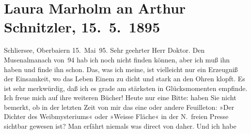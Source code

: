 

               \section[Laura Marholm an Arthur Schnitzler, 15. 5. 1895]{ Laura Marholm an Arthur Schnitzler, 15. 5. 1895}\nopagebreak{}\rehead{ }\begin{ledgroupsized}[t]{13cm}\normalsize\beginnumbering{} \toendnotes[C]{\smallbreak\pagebreak[2]} 
\toendnotes[C]{\smallbreak}\pstart
           \noindent{}\raggedleft{}{\pb}Schliersee, Oberbaiern\pend
           \pstart
           \raggedleft{}15. Mai 95.\pend
           \pstart{}Sehr geehrter Herr Doktor.\pend\pstart
           Den Musenalmanach von 94 hab ich noch nicht
                    finden können, aber ich muß ihn haben und finde ihn schon. Das, was ich meine,
                    ist vielleicht nur ein Erzeugniß der Einsamkeit, wo das Leben Einem zu dicht und
                    stark an den Ohren klopft. Es ist sehr merkwürdig, daß ich es grade am stärksten
                    in Glücksmomenten empfinde.\pend
           \pstart
           Ich freue mich auf ihre weiteren Bücher!\pend
           \pstart
           Heute nur eine Bitte: haben Sie nicht bemerkt, ob in der letzten Zeit von mir das
                    eine oder andere Feuilleton: »Der Dichter des
                        Weibmysteriums« oder »Weisse
                            Fläche« in der N. freien Presse
               sichtbar gewesen ist? Man erfährt niemals was direct von daher. Und ich habe

\end{ledgroupsized}
